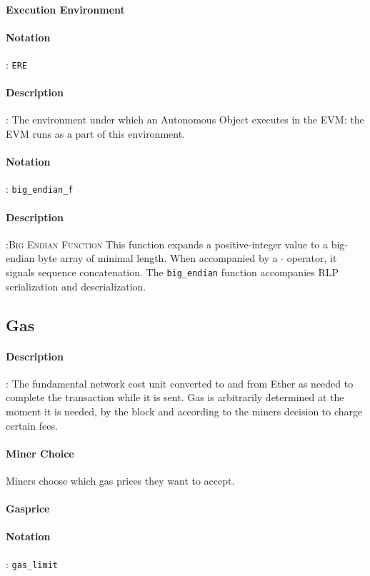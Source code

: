 \documentclass[10pt,a4paper,leqno,bibliography=totoc]{scrartcl}
\newenvironment{alphafootnotes}
{\par\edef\savedfootnotenumber{\number\value{footnote}}
\renewcommand{\thefootnote}{\alph{footnote}}
\setcounter{footnote}{0}}
{\par\setcounter{footnote}{\savedfootnotenumber}}
\begin{document}
\begin{alphafootnotes}
\begin{multicols*}{2}
				\paragraph{Execution Environment}
					\paragraph{Notation}: \texttt{ERE}
					\paragraph{Description}: The environment under which an Autonomous Object executes in the EVM: the EVM runs as a part of this environment.  

				\paragraph{Notation}: \texttt{big\_endian\_f}
				\paragraph{Description}:\textsc{Big Endian Function} This function expands a positive-integer value to a big-endian byte array of minimal length. When accompanied by a $\cdot$ operator, it signals sequence concatenation. The \texttt{big\_endian} function  accompanies RLP serialization and deserialization.

			\subsection{Gas}
				\paragraph{Description}: The fundamental network cost unit converted to and from Ether as needed to complete the transaction while it is sent. Gas is arbitrarily determined at the moment it is needed, by the block and according to the miners decision to charge certain fees. 
				\paragraph{Miner Choice}
					Miners choose which gas prices they want to accept.
	
				\paragraph{Gasprice}
					\paragraph{Notation}: \texttt{gas\_limit}

\end{multicols*}
\end{alphafootnotes}
\end{document}
